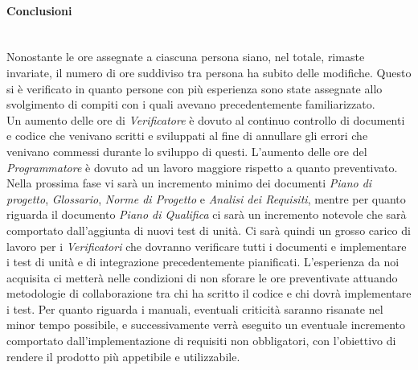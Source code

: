 \paragraph{Conclusioni} ~\\
Nonostante le ore assegnate a ciascuna persona siano, nel totale, rimaste invariate, il numero di ore suddiviso tra persona ha subito delle modifiche. Questo si è verificato in quanto persone con più esperienza sono state assegnate allo svolgimento di compiti con i quali avevano precedentemente familiarizzato. \\
Un aumento delle ore di \textit{Verificatore} è dovuto al continuo controllo di documenti e codice che venivano scritti e sviluppati al fine di annullare gli errori che venivano commessi durante lo sviluppo di questi. L'aumento delle ore del \textit{Programmatore} è dovuto ad un lavoro maggiore rispetto a quanto preventivato. \\
Nella prossima fase vi sarà un incremento minimo dei documenti \textit{Piano di progetto}, \textit{Glossario}, \textit{Norme di Progetto} e \textit{Analisi dei Requisiti}, mentre per quanto riguarda il documento \textit{Piano di Qualifica} ci sarà un incremento notevole che sarà comportato dall'aggiunta di nuovi test di unità. Ci sarà quindi un grosso carico di lavoro per i \textit{Verificatori} che dovranno verificare tutti i documenti e implementare i test di unità e di integrazione precedentemente pianificati. L'esperienza da noi acquisita ci metterà nelle condizioni di non sforare le ore preventivate attuando metodologie di collaborazione tra chi ha scritto il codice e chi dovrà implementare i test. Per quanto riguarda i manuali, eventuali criticità saranno risanate nel minor tempo possibile, e successivamente verrà eseguito un eventuale incremento comportato dall'implementazione di requisiti non obbligatori, con l'obiettivo di rendere il prodotto più appetibile e utilizzabile.\\

\pagebreak